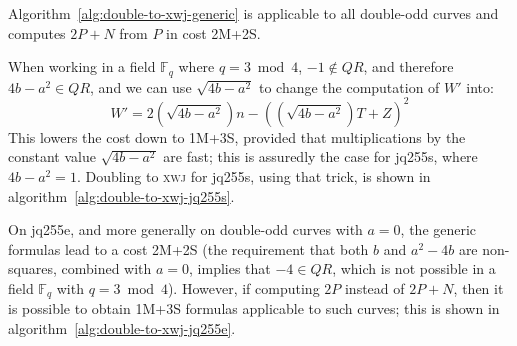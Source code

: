 \documentclass{llncs}
\newcommand{\QR}{QR}
\newcommand{\bF}{\mathbb{F}}
\newcommand{\cC}{\mathcal{C}}
\newcommand{\ezut}{\textsc{ezut}\xspace}
\newcommand{\xwj}{\textsc{xwj}\xspace}
\begin{document}
Algorithm~\ref{alg:double-to-xwj-generic} is applicable to all
double-odd curves and computes $2P+N$ from $P$ in cost 2M+2S.

\begin{algorithm}[H]
    \caption{\ \ Doubling \ezut to \xwj (cost: 2M+2S)}\label{alg:double-to-xwj-generic}
    \begin{algorithmic}[1]
    \end{algorithmic}
\end{algorithm}

When working in a field $\bF_q$ where $q = 3\bmod 4$, $-1 \notin\QR$,
and therefore $4b-a^2\in\QR$, and we can use $\sqrt{4b-a^2}$ to change
the computation of $W'$ into:
\begin{equation*}
    W' = 2(\sqrt{4b-a^2})n - ((\sqrt{4b-a^2})T + Z)^2
\end{equation*}
This lowers the cost down to 1M+3S, provided that multiplications by the
constant value $\sqrt{4b-a^2}$ are fast; this is assuredly the case for
jq255s, where $4b-a^2 = 1$. Doubling to \xwj for jq255s, using that trick,
is shown in algorithm~\ref{alg:double-to-xwj-jq255s}.

\begin{algorithm}[H]
    \caption{\ \ Doubling \ezut to \xwj on jq255s (cost: 1M+3S)}\label{alg:double-to-xwj-jq255s}
    \begin{algorithmic}[1]
        \Require{$P = (E{:}Z{:}U{:}T) \in \cC(-1,1/2)$}
    \end{algorithmic}
\end{algorithm}

On jq255e, and more generally on double-odd curves with $a = 0$, the
generic formulas lead to a cost 2M+2S (the requirement that both $b$ and
$a^2 - 4b$ are non-squares, combined with $a = 0$, implies that
$-4 \in\QR$, which is not possible in a field $\bF_q$ with $q = 3\bmod 4$).
However, if computing $2P$ instead of $2P+N$, then it is possible to
obtain 1M+3S formulas applicable to such curves; this is shown in
algorithm~\ref{alg:double-to-xwj-jq255e}.
\end{document}
